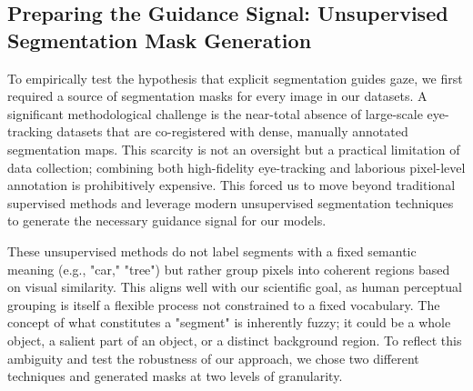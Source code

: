 \subsection{Preparing the Guidance Signal: Unsupervised Segmentation Mask Generation}
\label{sec:method_mask_generation}

To empirically test the hypothesis that explicit segmentation guides gaze, we first required a source of segmentation masks for every image in our datasets. A significant methodological challenge is the near-total absence of large-scale eye-tracking datasets that are co-registered with dense, manually annotated segmentation maps. This scarcity is not an oversight but a practical limitation of data collection; combining both high-fidelity eye-tracking and laborious pixel-level annotation is prohibitively expensive. This forced us to move beyond traditional supervised methods and leverage modern unsupervised segmentation techniques to generate the necessary guidance signal for our models.

These unsupervised methods do not label segments with a fixed semantic meaning (e.g., "car," "tree") but rather group pixels into coherent regions based on visual similarity. This aligns well with our scientific goal, as human perceptual grouping is itself a flexible process not constrained to a fixed vocabulary. The concept of what constitutes a "segment" is inherently fuzzy; it could be a whole object, a salient part of an object, or a distinct background region. To reflect this ambiguity and test the robustness of our approach, we chose two different techniques and generated masks at two levels of granularity.

